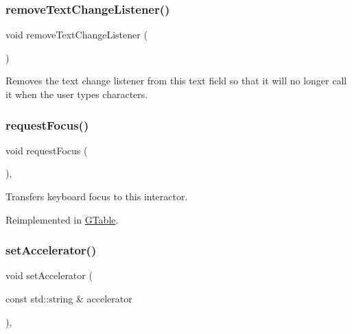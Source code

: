 \subsubsection{\texorpdfstring{remove\+Text\+Change\+Listener()}{removeTextChangeListener()}}
{\footnotesize\ttfamily void remove\+Text\+Change\+Listener (\begin{DoxyParamCaption}{ }\end{DoxyParamCaption})\hspace{0.3cm}{\ttfamily [virtual]}}



Removes the text change listener from this text field so that it will no longer call it when the user types characters. 

\mbox{\label{classsgl_1_1GInteractor_a519fb2ac767f8b2febbb50b898b8c8cb}} 
\subsubsection{\texorpdfstring{request\+Focus()}{requestFocus()}}
{\footnotesize\ttfamily void request\+Focus (\begin{DoxyParamCaption}{ }\end{DoxyParamCaption})\hspace{0.3cm}{\ttfamily [virtual]}, {\ttfamily [inherited]}}



Transfers keyboard focus to this interactor. 



Reimplemented in \mbox{\hyperlink{classsgl_1_1GTable_a5921efd0a5a83eacebdadb749fb3ea7a}{G\+Table}}.

\mbox{\label{classsgl_1_1GInteractor_ad15f102f62e2960576012f1aa0ba4b2e}} 
\subsubsection{\texorpdfstring{set\+Accelerator()}{setAccelerator()}}
{\footnotesize\ttfamily void set\+Accelerator (\begin{DoxyParamCaption}\item[{const std\+::string \&}]{accelerator }\end{DoxyParamCaption})\hspace{0.3cm}{\ttfamily [virtual]}, {\ttfamily [inherited]}}



